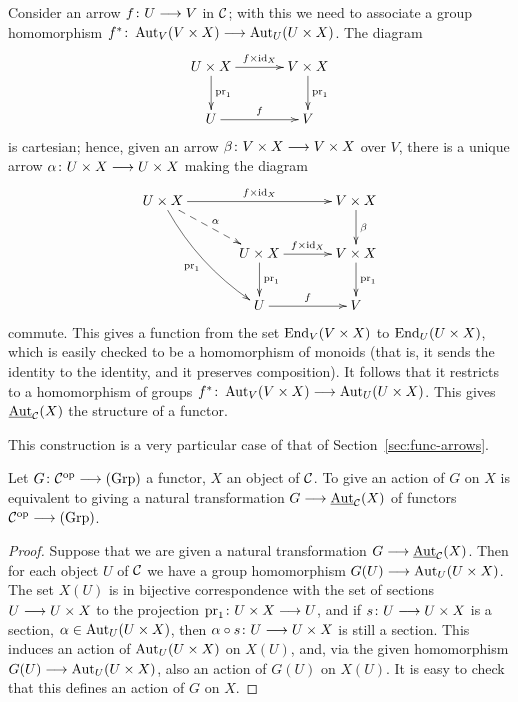 \begin{2   CONTRAVARIANT FUNCTORS}
\begin{2.2 Group objects}
Consider an arrow $f \colon U \arr V$ in $\mathcal{C}$; with this we need to associate a group homomorphism $f^* \colon \aut_V(V \times X) \arr \aut_U(U \times X)$. The diagram
   \[
   \xymatrix@C+10pt{
   U \times X \ar[r]^{f \times \id_X} \ar[d]^{\pr_1} &
   V \times X \ar[d]^{\pr_1}\\
   U \ar[r]^f & V
   }
   \]
is cartesian; hence, given an arrow $\beta \colon V \times X \arr V \times X$ over $V$, there is a unique arrow $\alpha \colon U \times X \arr U \times X$ making the diagram
   \[
   \xymatrix@C+10pt{
   U \times X
   \ar[rr]^{f \times \id_X} \ar@/_7pt/[rdd]_{\pr_1}
   \ar@{-->}[rd]^{\alpha}
   &&
   V \times X \ar[d]^{\beta}\\
   & U \times X \ar[r]^{f \times \id_X} \ar[d]^{\pr_1} &
   V \times X \ar[d]^{\pr_1}\\
   & U \ar[r]^f & V
   }
   \]
commute. This gives a function from the set $\operatorname{End}_{V}(V \times X)$ to $\operatorname{End}_{U}(U \times X)$, which is easily checked to be a homomorphism of monoids (that is, it sends the identity to the identity, and it preserves composition). It follows that it restricts to a homomorphism of groups $f^* \colon \aut_V(V \times X) \arr \aut_U(U \times X)$. This gives $ \mathop{\underline{\mathrm{Aut}}}\nolimits_{\mathcal{C}}(X)$ the structure of a functor.

This construction is a very particular case of that of Section~\ref{sec:func-arrows}.

\begin{proposition}\label{prop:action-homo}%
Let $G \colon \cC\op \arr \catgrp$ a functor, $X$ an object of $\mathcal{C}$. To give an action of $G$ on $X$ is equivalent to giving a natural transformation $G \arr \underaut_{\cC}(X)$ of functors $\cC\op \arr \catgrp$.
\end{proposition}

\begin{proof}
Suppose that we are given a natural transformation $G \arr \underaut_{\cC}(X)$. Then for each object $U$ of $\mathcal{C}$ we have a group homomorphism $G(U) \arr \aut_U(U \times X)$. The set $X(U)$ is in bijective correspondence with the set of sections $U \arr U \times X$ to the projection $\pr_1 \colon U \times X \arr U$, and if $s \colon U \arr U \times X$ is a section, $\alpha \in \operatorname{Aut}_U(U \times X)$, then $\alpha \circ s \colon U \arr U \times X$ is still a section. This induces an action of $\operatorname{Aut}_U(U \times X)$ on $X(U)$, and, via the given homomorphism $G(U) \arr \aut_U(U \times X)$, also an action of $G(U)$ on $X(U)$. It is easy to check that this defines an action of $G$ on $X$.


\end{proof}
\end{2.2 Group objects}
\end{2   CONTRAVARIANT FUNCTORS}
